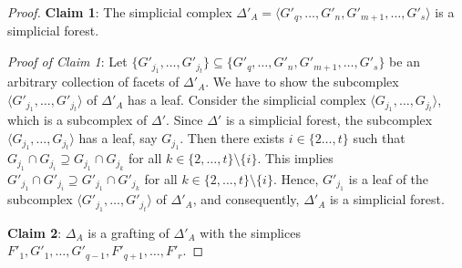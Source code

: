 \documentclass[12pt,a4paper,reqno]{amsart}
\theoremstyle{definition}
\def\D{\Delta}
\def\l{\langle}
\def\r{\rangle}
\begin{document}
\begin{proof}
    \noindent
\textbf{Claim 1}: The simplicial complex $\Delta'_{A}=\l G'_{q},\ldots,G'_n,G'_{m+1},\ldots,G'_s\r$ is a simplicial forest.

\noindent
\textit{Proof of Claim 1}: Let $\{G'_{j_1},\ldots,G'_{j_t}\}\subseteq \{G'_{q},\ldots,G'_n,G'_{m+1},\ldots,G'_{s}\}$ be an arbitrary collection of facets of $\D'_A$. We have to show the subcomplex $\l G'_{j_1},\ldots,G'_{j_t}\r$ of $\D'_A$ has a leaf. Consider the simplicial complex $\l G_{j_1},\ldots,G_{j_t}\r$, which is a subcomplex of $\D'$. Since $\D'$ is a simplicial forest, the subcomplex $\l G_{j_1},\ldots,G_{j_t}\r$ has a leaf, say $G_{j_1}$. Then there exists $i\in\{2\ldots, t\}$ such that $G_{j_1}\cap G_{j_{i}}\supseteq G_{j_1}\cap G_{j_k}$ for all $k\in\{2,\ldots,t\}\setminus\{i\}$. This implies $G'_{j_1}\cap G'_{j_{i}}\supseteq G'_{j_1}\cap G'_{j_k}$ for all $k\in\{2,\ldots,t\}\setminus\{i\}$. Hence, $G'_{j_1}$ is a leaf of the subcomplex $\l G'_{j_1},\ldots,G'_{j_t}\r$ of $\D'_A$, and consequently, $\D'_A$ is a simplicial forest.

\noindent
\textbf{Claim 2}: $\D_A$ is a grafting of $\D'_A$ with the simplices $F'_1,G'_1,\ldots,G'_{q-1},F'_{q+1},\ldots,F'_r$.


\end{proof}
\end{document}
